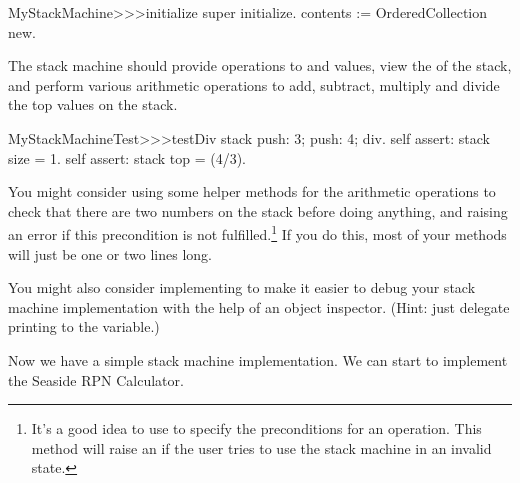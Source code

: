 \documentclass[a4paper,10pt,twoside]{book}
\begin{document}

\begin{code}{}
MyStackMachine>>>initialize
	super initialize.
	contents := OrderedCollection new.
\end{code}

The stack machine should provide operations to  and  values, view the
 of the stack, and perform various arithmetic operations to add, subtract,
multiply and divide the top values on the stack.


\begin{code}{}
MyStackMachineTest>>>testDiv
	stack
		push: 3;
		push: 4;
		div.
	self assert: stack size = 1.
	self assert: stack top = (4/3).
\end{code}

You might consider using some helper methods for the arithmetic operations to check that
there are two numbers on the stack before doing anything, and raising an error if this
precondition is not fulfilled.\footnote{It's a good idea to use  to
specify the preconditions for an operation.
This method will raise an  if the user tries to use the stack
machine in an invalid state.}
If you do this, most  of your methods will just be one or two lines long.

You might also consider implementing  to make it easier to
debug your stack machine implementation with the help of an object inspector.
(Hint: just delegate printing to the  variable.)


Now we have a simple stack machine implementation.
We can start to implement the Seaside RPN Calculator.
\end{document}
